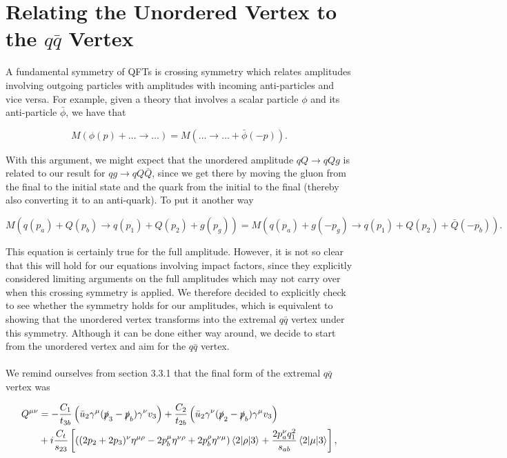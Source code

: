\chapter{Relating the Unordered Vertex to the $q\bar{q}$ Vertex}
\label{app:crossing}

A fundamental symmetry of QFTs is crossing symmetry which relates amplitudes involving outgoing particles with amplitudes with incoming anti-particles and vice versa. For example, given a theory that involves a scalar particle $\phi$ and its anti-particle $\bar{\phi}$, we have that 

\begin{equation}
M(\phi(p) + \ldots \to \ldots) = M(\ldots \to \ldots + \bar{\phi}(-p)).
\end{equation}

With this argument, we might expect that the unordered amplitude $qQ \to qQg$ is related to our result for $qg \to qQ\bar{Q}$, since we get there by moving the gluon from the final to the initial state and the quark from the initial to the final (thereby also converting it to an anti-quark). To put it another way

\begin{equation}
M(q(p_a) + Q(p_b) \to q(p_1) + Q(p_2) + g(p_g)) = M(q(p_a) + g(-p_g) \to q(p_1) + Q(p_2) + \bar{Q}(-p_b)).
\end{equation}

This equation is certainly true for the full amplitude. However, it is not so clear that this will hold for our equations involving impact factors, since they explicitly considered limiting arguments on the full amplitudes which may not carry over when this crossing symmetry is applied. We therefore decided to explicitly check to see whether the symmetry holds for our amplitudes, which is equivalent to showing that the unordered vertex transforms into the extremal $q\bar{q}$ vertex under this symmetry. Although it can be done either way around, we decide to start from the unordered vertex and aim for the $q\bar{q}$ vertex. \\
\\
We remind ourselves from section 3.3.1 that the final form of the extremal $q\bar{q}$ vertex was

\begin{equation}
\begin{split}
Q^{\mu \nu} &= -\frac{C_1}{t_{3b}} \left(\bar{u}_2 \gamma^\mu (\slashed{p}_3-\slashed{p}_b)\gamma^\nu v_3 \right) + \frac{C_2}{t_{2b}} \left( \bar{u}_2 \gamma^\nu (\slashed{p}_2-\slashed{p}_b) \gamma^\mu v_3 \right)  \\
&+ i  \frac{C_t}{s_{23}} \left[\left((2p_2+2p_3)^\nu \eta^{\mu \rho} - 2p_b^\mu \eta^{\nu \rho} + 2p_b^\rho \eta^{\nu \mu} \right) \mathinner{\langle2\vert\rho\vert3\rangle}_{} + \frac{2 p_a^\nu q_1^2}{s_{ab}} \mathinner{\langle2\vert\mu\vert3\rangle}_{} \right],
\end{split}
\end{equation}

